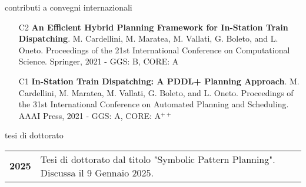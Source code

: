 \documentclass{resume} %
\begin{document}
\begin{rSection}{contributi a convegni internazionali}
\begin{enumerate}[leftmargin=5mm]
	\item[C2] \textbf{An Efficient Hybrid Planning Framework for In-Station Train Dispatching}. M. Cardellini, M. Maratea, M. Vallati, G. Boleto, and L. Oneto. Proceedings of the 21st International Conference on Computational Science. Springer, 2021 - GGS: B, CORE: A
	
	\item[C1] \textbf{In-Station Train Dispatching: A PDDL+ Planning Approach}. M. Cardellini, M. Maratea, M. Vallati, G. Boleto, and L. Oneto. Proceedings of the 31st International Conference on Automated Planning and Scheduling. AAAI Press, 2021 - GGS: A, CORE: A$^{++}$
\end{enumerate}
\end{rSection}

 \begin{rSection}{tesi di dottorato}
	\begin{tabularx}{0.95\textwidth} {lp{14cm}}
 \textbf{2025} & Tesi di dottorato dal titolo "Symbolic Pattern Planning". Discussa il 9 Gennaio 2025.
  \end{tabularx}
 \end{rSection}
\end{document}
